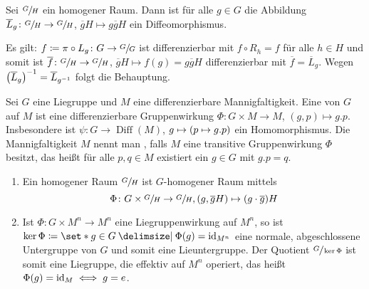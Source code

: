 \begin{korollar}
	Sei $\sfrac{G}{H}$ ein homogener Raum.
	Dann ist für alle $g \in G$ die Abbildung $\overline{L}_g \colon \sfrac{G}{H} \to \sfrac{G}{H}$, $\overline{g}H \mapsto g \overline{g}H$ ein Diffeomorphismus.
\end{korollar}
\begin{beweis}
	Es gilt: $f \coloneqq \pi \circ L_g \colon G \to \sfrac{G}{G}$ ist differenzierbar mit $f \circ R_h = f$ für alle $h \in H$ und somit ist $\overline{f} \colon \sfrac{G}{H} \to \sfrac{G}{H}$, $\overline{g}H \mapsto f(g) = g \overline{g}H$ differenzierbar mit $\overline{f} = \overline{L}_g$.
	Wegen $\enbrace*{\overline{L}_g}^{-1} = \overline{L}_{g^{-1}}$  folgt die Behauptung.
\end{beweis}

\begin{definition}
	Sei $G$ eine Liegruppe und $M$ eine differenzierbare Mannigfaltigkeit.
	Eine  von $G$ auf $M$ ist eine differenzierbare Gruppenwirkung $\Phi \colon G \times M \to M$, $(g,p) \mapsto g.p$.
	Insbesondere ist $\psi \colon G\to \operatorname{Diff}(M)$, $g \mapsto  \enbrace*{p \mapsto g.p}$ ein Homomorphismus.
	Die Mannigfaltigkeit $M$ nennt man , falls $M$ eine transitive Gruppenwirkung $\Phi$ besitzt, das heißt für alle $p,q \in M$ existiert ein $g \in G$ mit $g.p=q$.
\end{definition}

\begin{bemerkung*}
	\begin{enumerate}[1)]
		\item Ein homogener Raum $\sfrac{G}{H}$ ist $G$-homogener Raum mittels
		\[
			\Phi \colon G \times \sfrac{G}{H} \to \sfrac{G}{H} , (g,\overline{g}H) \mapsto (g \cdot \overline{g})H
		\]
		\item Ist $\Phi \colon G \times M^n \to M^n$ eine Liegruppenwirkung auf $M^n$, so ist $\ker \Phi \coloneqq \set*{g \in G \given \Phi(g) = \id_{M^n}}$ eine normale, abgeschlossene Untergruppe von $G$ und somit eine Lieuntergruppe.
		Der Quotient $\sfrac{G}{\ker \Phi}$ ist somit eine Liegruppe, die effektiv auf $M^n$ operiert, das heißt $\Phi(g)= \id_{M} \iff g=e$.
	\end{enumerate}
\end{bemerkung*}

